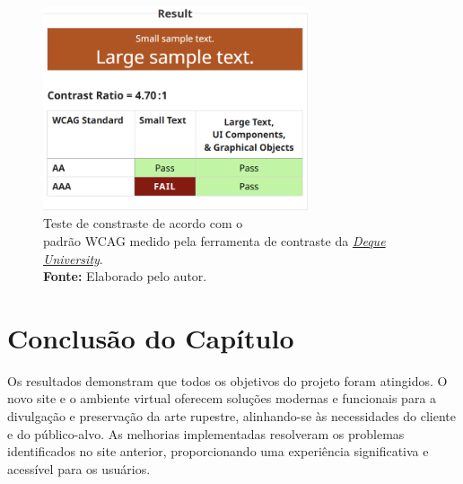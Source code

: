 \begin{figure}[H]
    \centering
    \includegraphics[height=6cm, keepaspectratio]{img/site/contraste.png}
    \caption{Teste de constraste de acordo com o \\ padrão WCAG medido pela ferramenta de contraste da \href{https://dequeuniversity.com/rules/axe/4.10/color-contrast}{\textit{Deque University}}. \\
    \textbf{Fonte:} Elaborado pelo autor.}
    \label{fig:testeconstraste}
\end{figure}


\section{Conclusão do Capítulo}
Os resultados demonstram que todos os objetivos do projeto foram atingidos. O novo site e o ambiente virtual oferecem soluções modernas e funcionais para a divulgação e preservação da arte rupestre, alinhando-se às necessidades do cliente e do público-alvo. As melhorias implementadas resolveram os problemas identificados no site anterior, proporcionando uma experiência significativa e acessível para os usuários.

